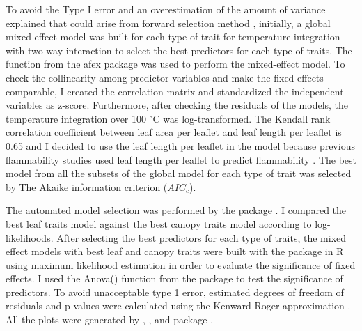 \documentclass[12pt]{report}
\begin{document}
To avoid the  Type I error and an overestimation of the amount of variance explained that could arise from forward selection method \citep{blanchet2008forward}, initially, a global mixed-effect model was built for each type of trait for temperature integration with two-way interaction to select the best predictors for each type of traits.
The  function from the afex package \citep{singmann2015packageafex,afexluke2017evaluating} was used to perform the mixed-effect model.
To check the collinearity among predictor variables and make the fixed effects comparable, I created the correlation matrix and standardized the independent variables as z-score. Furthermore, after checking the residuals of the models, the temperature integration over 100 $^{\circ}$C was log-transformed. 
The Kendall rank correlation coefficient between leaf area per leaflet and leaf length per leaflet is 0.65 and I decided to use the leaf length per leaflet in the model because previous flammability studies used leaf length per leaflet to predict flammability \citep{alam2020shoot}. 
The best model from all the subsets of the global model for each type of trait was selected by The Akaike information criterion ($AIC_{c}$).

The automated model selection was performed by the  package \citep{barton2015packagemumin}. I compared the best leaf traits model against the best canopy traits model according to log-likelihoods. After selecting the best predictors for each type of traits, the mixed effect models with best leaf and canopy traits were built with the  package in R \citep{bates2009package} using maximum likelihood estimation in order to evaluate the significance of fixed effects. I used the Anova() function from the  package \citep{fox2013hypothesis} to test the significance of predictors. To avoid unacceptable type 1 error, estimated degrees of freedom of residuals and p-values were calculated using the Kenward-Roger approximation \citep{kenward1997small}. All the plots were generated by , , and  package \citep{wickham2016packageggplot2, kassambara2017packagefactoextra,kassambara2020package}.
\end{document}
